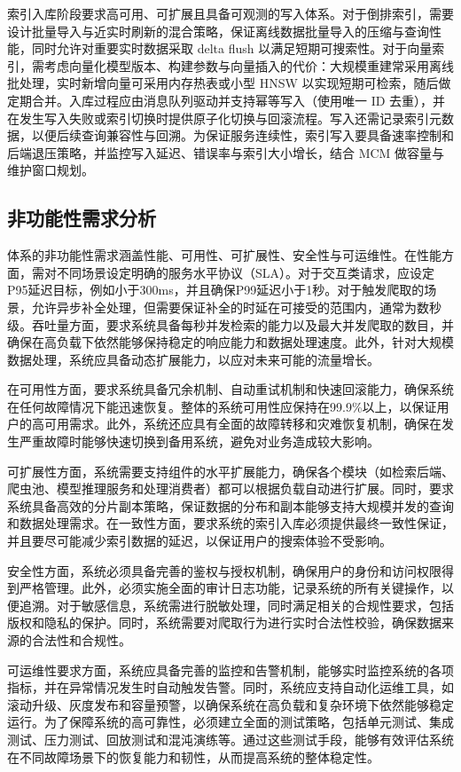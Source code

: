索引入库阶段要求高可用、可扩展且具备可观测的写入体系。对于倒排索引，需要设计批量导入与近实时刷新的混合策略，保证离线数据批量导入的压缩与查询性能，同时允许对重要实时数据采取 delta flush 以满足短期可搜索性。对于向量索引，需考虑向量化模型版本、构建参数与向量插入的代价：大规模重建常采用离线批处理，实时新增向量可采用内存热表或小型 HNSW 以实现短期可检索，随后做定期合并。入库过程应由消息队列驱动并支持幂等写入（使用唯一 ID 去重），并在发生写入失败或索引切换时提供原子化切换与回滚流程。写入还需记录索引元数据，以便后续查询兼容性与回溯。为保证服务连续性，索引写入要具备速率控制和后端退压策略，并监控写入延迟、错误率与索引大小增长，结合 MCM 做容量与维护窗口规划。

\subsection{非功能性需求分析} 
体系的非功能性需求涵盖性能、可用性、可扩展性、安全性与可运维性。在性能方面，需对不同场景设定明确的服务水平协议（SLA）。对于交互类请求，应设定P95延迟目标，例如小于300ms，并且确保P99延迟小于1秒。对于触发爬取的场景，允许异步补全处理，但需要保证补全的时延在可接受的范围内，通常为数秒级。吞吐量方面，要求系统具备每秒并发检索的能力以及最大并发爬取的数目，并确保在高负载下依然能够保持稳定的响应能力和数据处理速度。此外，针对大规模数据处理，系统应具备动态扩展能力，以应对未来可能的流量增长。

在可用性方面，要求系统具备冗余机制、自动重试机制和快速回滚能力，确保系统在任何故障情况下能迅速恢复。整体的系统可用性应保持在99.9\%以上，以保证用户的高可用需求。此外，系统还应具有全面的故障转移和灾难恢复机制，确保在发生严重故障时能够快速切换到备用系统，避免对业务造成较大影响。

可扩展性方面，系统需要支持组件的水平扩展能力，确保各个模块（如检索后端、爬虫池、模型推理服务和处理消费者）都可以根据负载自动进行扩展。同时，要求系统具备高效的分片副本策略，保证数据的分布和副本能够支持大规模并发的查询和数据处理需求。在一致性方面，要求系统的索引入库必须提供最终一致性保证，并且要尽可能减少索引数据的延迟，以保证用户的搜索体验不受影响。

安全性方面，系统必须具备完善的鉴权与授权机制，确保用户的身份和访问权限得到严格管理。此外，必须实施全面的审计日志功能，记录系统的所有关键操作，以便追溯。对于敏感信息，系统需进行脱敏处理，同时满足相关的合规性要求，包括版权和隐私的保护。同时，系统需要对爬取行为进行实时合法性校验，确保数据来源的合法性和合规性。

可运维性要求方面，系统应具备完善的监控和告警机制，能够实时监控系统的各项指标，并在异常情况发生时自动触发告警。同时，系统应支持自动化运维工具，如滚动升级、灰度发布和容量预警，以确保系统在高负载和复杂环境下依然能够稳定运行。为了保障系统的高可靠性，必须建立全面的测试策略，包括单元测试、集成测试、压力测试、回放测试和混沌演练等。通过这些测试手段，能够有效评估系统在不同故障场景下的恢复能力和韧性，从而提高系统的整体稳定性。
